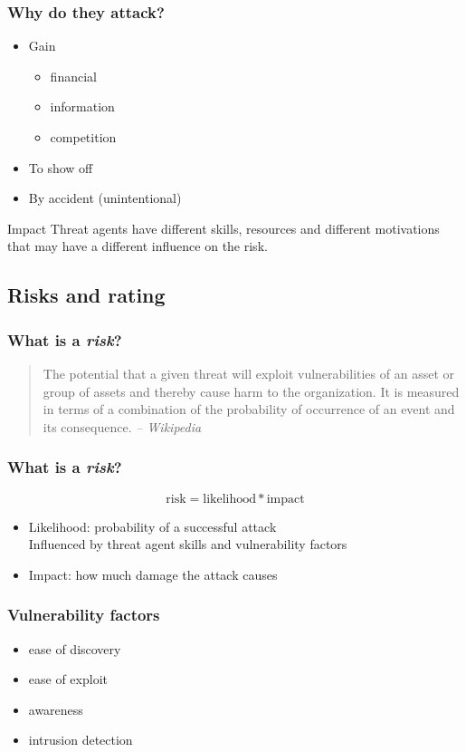 \begin{frame}
\frametitle{Why do they attack?}
\begin{itemize}
\item Gain
	\begin{itemize}
	\item financial
	\item information
	\item competition
	\end{itemize}
\item To show off
\item By accident (unintentional)
\end{itemize}
\begin{block}{Impact}
Threat agents have different skills, resources and different motivations that
may have a different influence on the risk.
\end{block}
\end{frame}

\subsection{Risks and rating}

\begin{frame}
\frametitle{What is a \emph{risk}?}
\begin{quote}
The potential that a given threat will exploit vulnerabilities of
an asset or group of assets and thereby cause harm to the organization. It
is measured in terms of a combination of the probability of occurrence of an
event and its consequence.
\textit{-- Wikipedia}
\end{quote}
\end{frame}

\begin{frame}
\frametitle{What is a \emph{risk}?}
\[ \text{risk} = \text{likelihood} * \text{impact} \]
\begin{itemize}
\item Likelihood: probability of a successful attack
	\\ Influenced by threat agent skills and vulnerability factors
\item Impact: how much damage the attack causes
\end{itemize}
\end{frame}

\begin{frame}
\frametitle{Vulnerability factors}
\begin{itemize}
\item ease of discovery
\item ease of exploit
\item awareness
\item intrusion detection
\end{itemize}
\end{frame}

